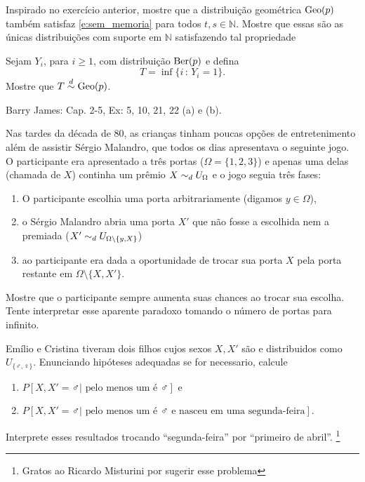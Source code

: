 \begin{exercise}
  Inspirado no exercício anterior, mostre que a distribuição geométrica $\operatorname{Geo}(p)$ também satisfaz \eqref{e:sem_memoria} para todos $t, s \in \mathbb{N}$.
  Mostre que essas são as únicas distribuições com suporte em $\mathbb{N}$ satisfazendo tal propriedade
\end{exercise}

\begin{exercise}
  \label{x:geo_time}
  Sejam $Y_i$, para $i \geq 1$, \iid com distribuição $\operatorname{Ber}(p)$ e defina
  \begin{equation}
    T = \inf\{i\, : \, Y_i = 1\}.
  \end{equation}
  Mostre que $T \overset{d}\sim \operatorname{Geo}(p)$.
\end{exercise}

\begin{exercise}
  Barry James: Cap. 2-5, Ex: 5, 10, 21, 22 (a) e (b).
\end{exercise}

\begin{exercise}
  Nas tardes da década de 80, as crianças tinham poucas opções de entretenimento além de assistir Sérgio Malandro, que todos os dias apresentava o seguinte jogo.
  O participante era apresentado a três portas ($\Omega = \{1,2,3\}$) e apenas uma delas (chamada de $X$) continha um prêmio $X \sim_d U_{\Omega}$ e o jogo seguia três fases:
  \begin{enumerate}[\quad a)]
  \item O participante escolhia uma porta arbitrariamente (digamos $y \in \Omega$),
  \item o Sérgio Malandro abria uma porta $X'$ que não fosse a escolhida nem a premiada ($X' \sim_d U_{\Omega \setminus \{y, X\}}$)
  \item ao participante era dada a oportunidade de trocar sua porta $X$ pela porta restante em $\Omega \setminus \{X, X'\}$.
  \end{enumerate}
  Mostre que o participante sempre aumenta suas chances ao trocar sua escolha.
  Tente interpretar esse aparente paradoxo tomando o número de portas para infinito.
\end{exercise}

\begin{exercise}
  Emílio e Cristina tiveram dois filhos cujos sexos $X, X'$ são \iid e distribuidos como $U_{\{\male, \female\}}$.
Enunciando hipóteses adequadas se for necessario,  calcule
  \begin{enumerate}[\quad a)]
  \item $P[X, X' = \male | \text{ pelo menos um é $\male$}]$ e
  \item $P[X, X' = \male | \text{ pelo menos um é $\male$ e nasceu em uma segunda-feira}]$.
  \end{enumerate}
  Interprete esses resultados trocando ``segunda-feira'' por ``primeiro de abril''.
  \footnote{Gratos ao Ricardo Misturini por sugerir esse problema}
\end{exercise}

